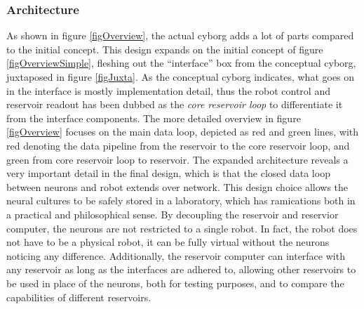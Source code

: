 \subsubsection{Architecture}
As shown in figure \ref{figOverview}, the actual cyborg adds a lot of parts
compared to the initial concept.
This design expands on the initial concept of figure \ref{figOverviewSimple}, fleshing
out the ``interface'' box from the conceptual cyborg, juxtaposed in figure
\ref{figJuxta}.
As the conceptual cyborg indicates, what goes on in the interface is mostly
implementation detail, thus the robot control and reservoir readout has been
dubbed as the \emph{core reservoir loop} to differentiate it from the interface
components.
The more detailed overview in figure \ref{figOverview} focuses on the main data loop, depicted as
red and green lines, with red denoting the data pipeline from the reservoir to
the core reservoir loop, and green from core reservoir loop to reservoir.
The expanded architecture reveals a very important detail in the final design,
which is that the closed data loop between neurons and robot extends over
network. 
This design choice allows the neural cultures to be safely stored in a
laboratory, which has ramications both in a practical and philosophical sense.
By decoupling the reservoir and reservior computer, the neurons are not
restricted to a single robot.
In fact, the robot does not have to be a physical robot, it can be fully virtual
without the neurons noticing any difference.
Additionally, the reservoir computer can interface with any reservoir as long as
the interfaces are adhered to, allowing other reservoirs to be used in place of
the neurons, both for testing purposes, and to compare the capabilities of
different reservoirs.
